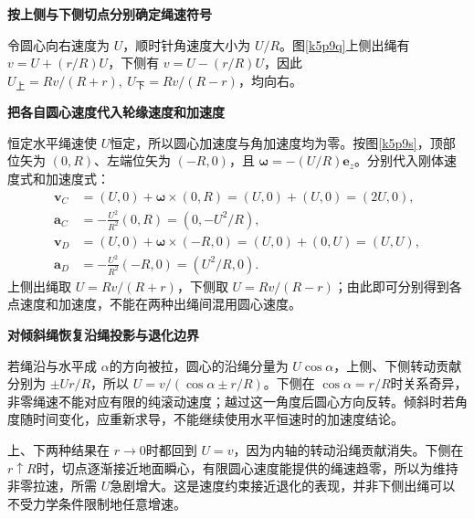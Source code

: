 \begin{solution}\textbf{按上侧与下侧切点分别确定绳速符号}\par\nobreak
令圆心向右速度为 $U$，顺时针角速度大小为 $U/R$。图\ref{k5p9q}上侧出绳有 $v=U+(r/R)U$，下侧有 $v=U-(r/R)U$，因此 $\boxed{U_{\text{上}}=Rv/(R+r),\ U_{\text{下}}=Rv/(R-r)}$，均向右。



\par\medskip{}\noindent\textbf{把各自圆心速度代入轮缘速度和加速度}\par\nobreak
恒定水平绳速使 $U$恒定，所以圆心加速度与角加速度均为零。按图\ref{k5p9s}，顶部位矢为 $(0,R)$、左端位矢为 $(-R,0)$，且 $\bm\omega=-(U/R)\bm e_z$。分别代入刚体速度式和加速度式：
\begin{align*}
 \bm v_C&=(U,0)+\bm\omega\times(0,R)=(U,0)+(U,0)=(2U,0),\\
 \bm a_C&=-\frac{U^2}{R^2}(0,R)=(0,-U^2/R),\\
 \bm v_D&=(U,0)+\bm\omega\times(-R,0)=(U,0)+(0,U)=(U,U),\\
 \bm a_D&=-\frac{U^2}{R^2}(-R,0)=(U^2/R,0).
\end{align*}
上侧出绳取 $U=Rv/(R+r)$，下侧取 $U=Rv/(R-r)$；由此即可分别得到各点速度和加速度，不能在两种出绳间混用圆心速度。



\par\medskip{}\noindent\textbf{对倾斜绳恢复沿绳投影与退化边界}\par\nobreak
若绳沿与水平成 $\alpha$的方向被拉，圆心的沿绳分量为 $U\cos\alpha$，上侧、下侧转动贡献分别为 $\pm Ur/R$，所以 $\boxed{U=v/(\cos\alpha\pm r/R)}$。下侧在 $\cos\alpha=r/R$时关系奇异，非零绳速不能对应有限的纯滚动速度；越过这一角度后圆心方向反转。倾斜时若角度随时间变化，应重新求导，不能继续使用水平恒速时的加速度结论。

上、下两种结果在 $r\to0$时都回到 $U=v$，因为内轴的转动沿绳贡献消失。下侧在 $r\uparrow R$时，切点逐渐接近地面瞬心，有限圆心速度能提供的绳速趋零，所以为维持非零拉速，所需 $U$急剧增大。这是速度约束接近退化的表现，并非下侧出绳可以不受力学条件限制地任意增速。\end{solution}

